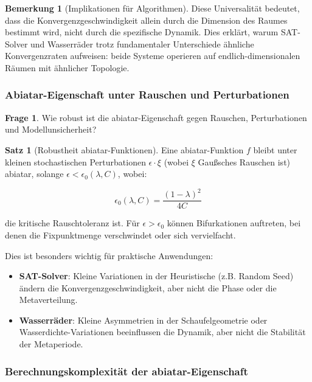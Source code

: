 \documentclass[a4paper,12pt]{article}
\theoremstyle{definition}
\newtheorem{satz}{Satz}
\newtheorem{bemerkung}{Bemerkung}
\newtheorem{frage}{Frage}
\begin{document}
\begin{bemerkung}[Implikationen für Algorithmen]
Diese Universalität bedeutet, dass die Konvergenzgeschwindigkeit allein durch die Dimension des Raumes bestimmt wird, nicht durch die spezifische Dynamik. Dies erklärt, warum SAT-Solver und Wasserräder trotz fundamentaler Unterschiede ähnliche Konvergenzraten aufweisen: beide Systeme operieren auf endlich-dimensionalen Räumen mit ähnlicher Topologie.
\end{bemerkung}

\subsubsection{Abiatar-Eigenschaft unter Rauschen und Perturbationen}

\begin{frage}
Wie robust ist die abiatar-Eigenschaft gegen Rauschen, Perturbationen und Modellunsicherheit?
\end{frage}

\begin{satz}[Robustheit abiatar-Funktionen]
Eine abiatar-Funktion $f$ bleibt unter kleinen stochastischen Perturbationen $\epsilon \cdot \xi$ (wobei $\xi$ Gaußsches Rauschen ist) abiatar, solange $\epsilon < \epsilon_0(\lambda, C)$, wobei:

\begin{equation}
\epsilon_0(\lambda, C) = \frac{(1-\lambda)^2}{4C}
\end{equation}

die kritische Rauschtoleranz ist. Für $\epsilon > \epsilon_0$ können Bifurkationen auftreten, bei denen die Fixpunktmenge verschwindet oder sich vervielfacht.
\end{satz}

Dies ist besonders wichtig für praktische Anwendungen:

\begin{itemize}
	\item \textbf{SAT-Solver}: Kleine Variationen in der Heuristische (z.B. Random Seed) ändern die Konvergenzgeschwindigkeit, aber nicht die Phase oder die Metaverteilung.
	
	\item \textbf{Wasserräder}: Kleine Asymmetrien in der Schaufelgeometrie oder Wasserdichte-Variationen beeinflussen die Dynamik, aber nicht die Stabilität der Metaperiode.
\end{itemize}

\subsubsection{Berechnungskomplexität der abiatar-Eigenschaft}
\end{document}
